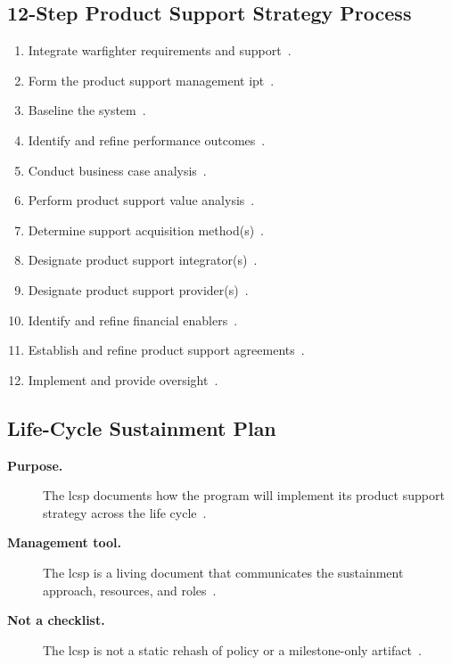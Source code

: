 \documentclass[../main.tex]{subfiles}
\begin{document}
\subsection{12-Step Product Support Strategy Process}
\begin{enumerate}
  \item Integrate warfighter requirements and support~\autocite{edo-3-5-4-acquisition-logistics-2025}.
  \item Form the product support management \ac{ipt}~\autocite{edo-3-5-4-acquisition-logistics-2025}.
  \item Baseline the system~\autocite{edo-3-5-4-acquisition-logistics-2025}.
  \item Identify and refine performance outcomes~\autocite{edo-3-5-4-acquisition-logistics-2025}.
  \item Conduct business case analysis~\autocite{edo-3-5-4-acquisition-logistics-2025}.
  \item Perform product support value analysis~\autocite{edo-3-5-4-acquisition-logistics-2025}.
  \item Determine support acquisition method(s)~\autocite{edo-3-5-4-acquisition-logistics-2025}.
  \item Designate product support integrator(s)~\autocite{edo-3-5-4-acquisition-logistics-2025}.
  \item Designate product support provider(s)~\autocite{edo-3-5-4-acquisition-logistics-2025}.
  \item Identify and refine financial enablers~\autocite{edo-3-5-4-acquisition-logistics-2025}.
  \item Establish and refine product support agreements~\autocite{edo-3-5-4-acquisition-logistics-2025}.
  \item Implement and provide oversight~\autocite{edo-3-5-4-acquisition-logistics-2025}.
\end{enumerate}

\subsection{Life-Cycle Sustainment Plan}
\begin{description}
  \item[\textbf{Purpose.}] The \ac{lcsp} documents how the program will implement its product support strategy across the life cycle~\autocite{edo-3-5-4-acquisition-logistics-2025}.
  \item[\textbf{Management tool.}] The \ac{lcsp} is a living document that communicates the sustainment approach, resources, and roles~\autocite{edo-3-5-4-acquisition-logistics-2025}.
  \item[\textbf{Not a checklist.}] The \ac{lcsp} is not a static rehash of policy or a milestone-only artifact~\autocite{edo-3-5-4-acquisition-logistics-2025}.
\end{description}
\end{document}

